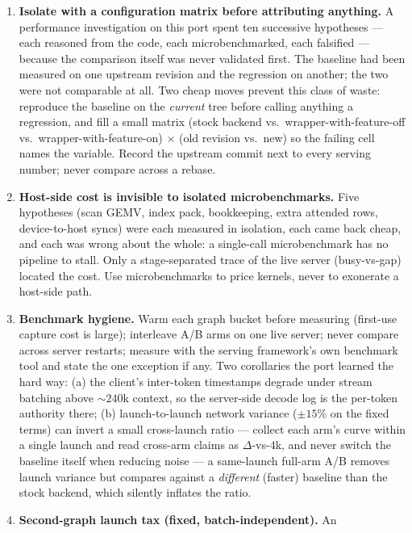\documentclass[11pt]{article}
\begin{document}
\begin{enumerate}[itemsep=2pt]
tok/s from one such copy, with the profiler showing GPU busy $6.4$\,ms
against a $279$\,ms step. Design the per-step data flow around this
constraint before writing the recall path, not after.
\item \textbf{Isolate with a configuration matrix before attributing
anything.} A performance investigation on this port spent ten successive
hypotheses --- each reasoned from the code, each microbenchmarked, each
falsified --- because the comparison itself was never validated first. The
baseline had been measured on one upstream revision and the regression on
another; the two were not comparable at all. Two cheap moves prevent this
class of waste: reproduce the baseline on the \emph{current} tree before
calling anything a regression, and fill a small matrix (stock backend vs.\
wrapper-with-feature-off vs.\ wrapper-with-feature-on) $\times$ (old
revision vs.\ new) so the failing cell names the variable. Record the
upstream commit next to every serving number; never compare across a rebase.
\item \textbf{Host-side cost is invisible to isolated microbenchmarks.}
Five hypotheses (scan GEMV, index pack, bookkeeping, extra attended rows,
device-to-host syncs) were each measured in isolation, each came back cheap,
and each was wrong about the whole: a single-call microbenchmark has no
pipeline to stall. Only a stage-separated trace of the live server
(busy-vs-gap) located the cost. Use microbenchmarks to price kernels, never
to exonerate a host-side path.
\item \textbf{Benchmark hygiene.} Warm each graph bucket before measuring
(first-use capture cost is large); interleave A/B arms on one live server;
never compare across server restarts; measure with the serving framework's
own benchmark tool and state the one exception if any. Two corollaries the
port learned the hard way: (a) the client's inter-token timestamps degrade
under stream batching above ${\sim}240$k context, so the server-side decode
log is the per-token authority there; (b) launch-to-launch network variance
($\pm 15\%$ on the fixed terms) can invert a small cross-launch ratio ---
collect each arm's curve within a single launch and read cross-arm claims as
$\Delta$-vs-4k, and never switch the baseline itself when reducing noise ---
a same-launch full-arm A/B removes launch variance but compares against a
\emph{different} (faster) baseline than the stock backend, which silently
inflates the ratio.
\item \textbf{Second-graph launch tax (fixed, batch-independent).} An

\end{enumerate}
\end{document}
